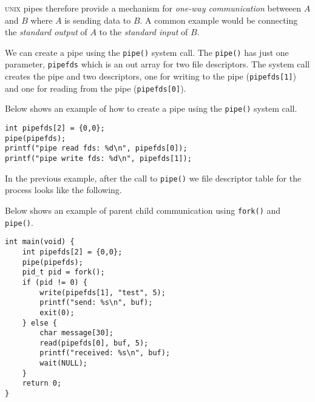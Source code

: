 
\textsc{unix} pipes therefore provide a mechanism
for \textit{one-way communication} betweeen $A$ and $B$ where 
$A$ is sending data to $B$. A common example would be 
connecting the \textit{standard output} of $A$ 
to the \textit{standard input} of $B$.

We can create a pipe using the \lstinline{pipe()} system call.
The \lstinline{pipe()} has just one parameter, \lstinline{pipefds} 
which is an out array for two file descriptors. 
The system call creates the pipe and two descriptors, 
one for writing to the pipe (\lstinline{pipefds[1]}) 
and one for reading from the pipe (\lstinline{pipefds[0]}). 

\begin{example}
Below shows an example of how to create a pipe 
using the \lstinline{pipe()} system call.

\begin{lstlisting}
int pipefds[2] = {0,0};
pipe(pipefds);
printf("pipe read fds: %d\n", pipefds[0]);
printf("pipe write fds: %d\n", pipefds[1]);
\end{lstlisting}
\end{example}

\frmrule

In the previous example, after the call to \lstinline{pipe()} 
we file descriptor table for the process looks like the following.


\frmrule


\begin{example}
Below shows an example of parent child communication 
using \lstinline{fork()} and \lstinline{pipe()}.


\begin{lstlisting}
int main(void) {
    int pipefds[2] = {0,0};
    pipe(pipefds);
    pid_t pid = fork();
    if (pid != 0) { 
        write(pipefds[1], "test", 5);
        printf("send: %s\n", buf);
        exit(0);
    } else { 
        char message[30];
        read(pipefds[0], buf, 5);
        printf("received: %s\n", buf);
        wait(NULL);
    }
    return 0;
}
\end{lstlisting}
\end{example}






\frmrule

